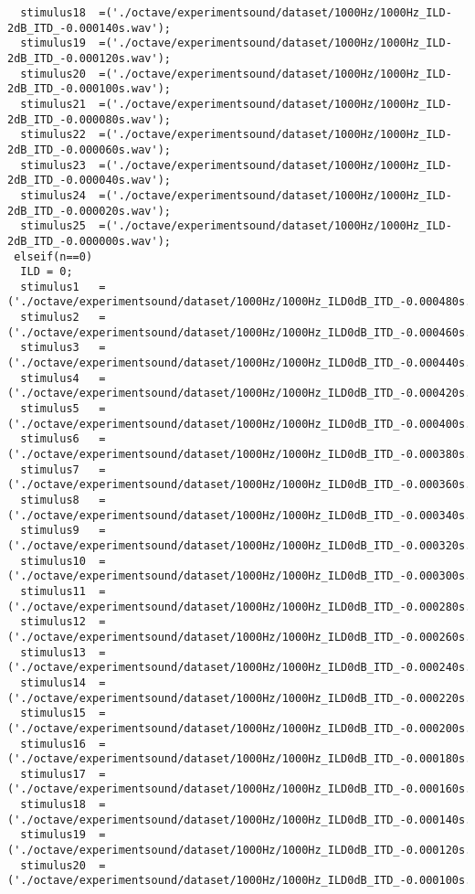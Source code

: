 {\begin{verbatim}
  stimulus18  =('./octave/experimentsound/dataset/1000Hz/1000Hz_ILD-2dB_ITD_-0.000140s.wav');
  stimulus19  =('./octave/experimentsound/dataset/1000Hz/1000Hz_ILD-2dB_ITD_-0.000120s.wav');
  stimulus20  =('./octave/experimentsound/dataset/1000Hz/1000Hz_ILD-2dB_ITD_-0.000100s.wav');
  stimulus21  =('./octave/experimentsound/dataset/1000Hz/1000Hz_ILD-2dB_ITD_-0.000080s.wav');
  stimulus22  =('./octave/experimentsound/dataset/1000Hz/1000Hz_ILD-2dB_ITD_-0.000060s.wav');
  stimulus23  =('./octave/experimentsound/dataset/1000Hz/1000Hz_ILD-2dB_ITD_-0.000040s.wav');
  stimulus24  =('./octave/experimentsound/dataset/1000Hz/1000Hz_ILD-2dB_ITD_-0.000020s.wav');
  stimulus25  =('./octave/experimentsound/dataset/1000Hz/1000Hz_ILD-2dB_ITD_-0.000000s.wav');
 elseif(n==0)
  ILD = 0;
  stimulus1   =('./octave/experimentsound/dataset/1000Hz/1000Hz_ILD0dB_ITD_-0.000480s.wav');
  stimulus2   =('./octave/experimentsound/dataset/1000Hz/1000Hz_ILD0dB_ITD_-0.000460s.wav');
  stimulus3   =('./octave/experimentsound/dataset/1000Hz/1000Hz_ILD0dB_ITD_-0.000440s.wav');
  stimulus4   =('./octave/experimentsound/dataset/1000Hz/1000Hz_ILD0dB_ITD_-0.000420s.wav');
  stimulus5   =('./octave/experimentsound/dataset/1000Hz/1000Hz_ILD0dB_ITD_-0.000400s.wav');
  stimulus6   =('./octave/experimentsound/dataset/1000Hz/1000Hz_ILD0dB_ITD_-0.000380s.wav');
  stimulus7   =('./octave/experimentsound/dataset/1000Hz/1000Hz_ILD0dB_ITD_-0.000360s.wav');
  stimulus8   =('./octave/experimentsound/dataset/1000Hz/1000Hz_ILD0dB_ITD_-0.000340s.wav');
  stimulus9   =('./octave/experimentsound/dataset/1000Hz/1000Hz_ILD0dB_ITD_-0.000320s.wav');
  stimulus10  =('./octave/experimentsound/dataset/1000Hz/1000Hz_ILD0dB_ITD_-0.000300s.wav');
  stimulus11  =('./octave/experimentsound/dataset/1000Hz/1000Hz_ILD0dB_ITD_-0.000280s.wav');
  stimulus12  =('./octave/experimentsound/dataset/1000Hz/1000Hz_ILD0dB_ITD_-0.000260s.wav');
  stimulus13  =('./octave/experimentsound/dataset/1000Hz/1000Hz_ILD0dB_ITD_-0.000240s.wav');
  stimulus14  =('./octave/experimentsound/dataset/1000Hz/1000Hz_ILD0dB_ITD_-0.000220s.wav');
  stimulus15  =('./octave/experimentsound/dataset/1000Hz/1000Hz_ILD0dB_ITD_-0.000200s.wav');
  stimulus16  =('./octave/experimentsound/dataset/1000Hz/1000Hz_ILD0dB_ITD_-0.000180s.wav');
  stimulus17  =('./octave/experimentsound/dataset/1000Hz/1000Hz_ILD0dB_ITD_-0.000160s.wav');
  stimulus18  =('./octave/experimentsound/dataset/1000Hz/1000Hz_ILD0dB_ITD_-0.000140s.wav');
  stimulus19  =('./octave/experimentsound/dataset/1000Hz/1000Hz_ILD0dB_ITD_-0.000120s.wav');
  stimulus20  =('./octave/experimentsound/dataset/1000Hz/1000Hz_ILD0dB_ITD_-0.000100s.wav');

\end{verbatim}}
